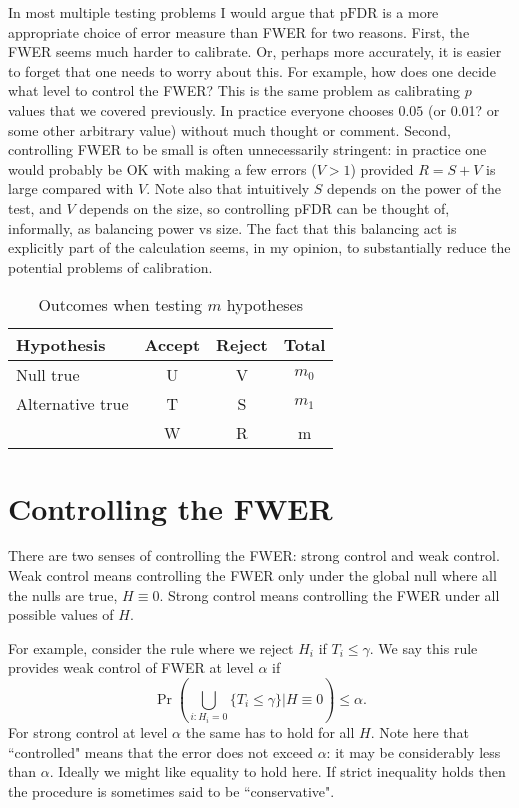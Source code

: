 \documentclass[times,11pt]{article}
\def\pFDR{\text{pFDR}}
\begin{document}
In most multiple testing problems I would argue that $\pFDR$ is a more appropriate choice of error measure than FWER for two reasons. First, 
the FWER seems much harder to calibrate. Or, perhaps more accurately, it is easier to forget that
one needs to worry about this. For example, how
does one decide what level to control the FWER? This is the same problem as calibrating $p$ values that we covered previously.  In practice everyone chooses $0.05$ (or 0.01? or some other arbitrary value) without much thought or comment. 
Second,
controlling FWER to be small is often unnecessarily stringent: in practice one would probably be OK with making a few errors ($V>1$) provided $R=S+V$ is large compared with $V$. Note also that intuitively $S$ depends on the power of the test, and $V$ depends on the size, so controlling pFDR can be thought of, informally, as balancing power vs size.
The fact that this balancing act is explicitly part
of the calculation seems, in my opinion, to substantially reduce
the potential problems of calibration.


\begin{table} 
\begin{center}
\begin{tabular}{lccc}
Hypothesis & Accept & Reject & Total \\ \hline
Null true & U & V & $m_0$ \\
Alternative true & T & S & $m_1$ \\
& W & R & m \\
\end{tabular}
\end{center}
\caption{Outcomes when testing $m$ hypotheses} \label{multiple}
\end{table}

\section{Controlling the FWER}

There are two senses of controlling the FWER: strong control and weak control. 
Weak control means controlling the FWER only under the global null where all the nulls are true, $H \equiv 0$. Strong control means controlling the FWER under all 
possible values of $H$.

For example, consider the rule where we reject $H_i$ if $T_i \leq \gamma$. We say this rule provides weak control of FWER at level $\alpha$ if
\begin{equation}
\Pr \left(\bigcup_{i:H_i =0} \{T_i \leq \gamma\} \bigg| H \equiv 0 \right) \leq \alpha. \label{fwer.control}
\end{equation}
For strong control at level $\alpha$ the same has to hold for all $H$. Note here that ``controlled" means that the error does not exceed $\alpha$: it may be considerably less than $\alpha$. Ideally we might like equality to hold here. If strict inequality holds then the procedure is sometimes said to be ``conservative".
\end{document}

